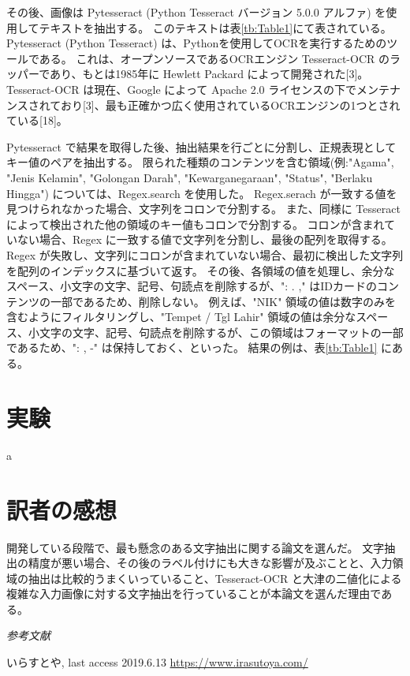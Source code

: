 \documentclass[uplatex, twocolumn,10pt]{jsarticle}
\begin{document}
その後、画像は Pytesseract (Python Tesseract バージョン 5.0.0 アルファ) を使用してテキストを抽出する。
このテキストは表\ref{tb:Table1}にて表されている。
Pytesseract (Python Tesseract) は、Pythonを使用してOCRを実行するためのツールである。
これは、オープンソースであるOCRエンジン Tesseract-OCR のラッパーであり、もとは1985年に Hewlett Packard によって開発された[3]。
Tesseract-OCR は現在、Google によって Apache 2.0 ライセンスの下でメンテナンスされており[3]、最も正確かつ広く使用されているOCRエンジンの1つとされている[18]。

Pytesseract で結果を取得した後、抽出結果を行ごとに分割し、正規表現としてキー値のペアを抽出する。
限られた種類のコンテンツを含む領域(例:"Agama", "Jenis Kelamin", "Golongan Darah", "Kewarganegaraan", "Status", "Berlaku Hingga") については、Regex.search を使用した。
Regex.serach が一致する値を見つけられなかった場合、文字列をコロンで分割する。
また、同様に Tesseract によって検出された他の領域のキー値もコロンで分割する。
コロンが含まれていない場合、Regex に一致する値で文字列を分割し、最後の配列を取得する。
Regex が失敗し、文字列にコロンが含まれていない場合、最初に検出した文字列を配列のインデックスに基づいて返す。
その後、各領域の値を処理し、余分なスペース、小文字の文字、記号、句読点を削除するが、": . ," はIDカードのコンテンツの一部であるため、削除しない。
例えば、"NIK" 領域の値は数字のみを含むようにフィルタリングし、"Tempet / Tgl Lahir" 領域の値は余分なスペース、小文字の文字、記号、句読点を削除するが、この領域はフォーマットの一部であるため、": , -" は保持しておく、といった。
結果の例は、表\ref{tb:Table1} にある。


\section{実験}\label{sec:Experiment}
a



\section{訳者の感想}
開発している段階で、最も懸念のある文字抽出に関する論文を選んだ。
文字抽出の精度が悪い場合、その後のラベル付けにも大きな影響が及ぶことと、入力領域の抽出は比較的うまくいっていること、Tesseract-OCR と大津の二値化による複雑な入力画像に対する文字抽出を行っていることが本論文を選んだ理由である。

\emph{参考文献}

\begin{thebibliography}{99}
     いらすとや, last access 2019.6.13 \url{https://www.irasutoya.com/}
    
    
    
\end{thebibliography}
\end{document}
